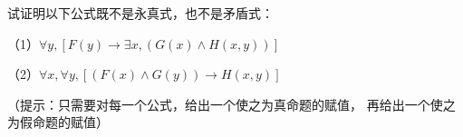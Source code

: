 \begin{prob}试证明以下公式既不是永真式，也不是矛盾式：

（1）$\forall y,[F(y)\rightarrow\exists x,(G(x)\wedge H(x,y))]$

（2）$\forall x,\forall y,[(F(x)\wedge G(y))\rightarrow H(x,y)]$
\end{prob}

（提示：只需要对每一个公式，给出一个使之为真命题的赋值，
再给出一个使之为假命题的赋值）\vs







